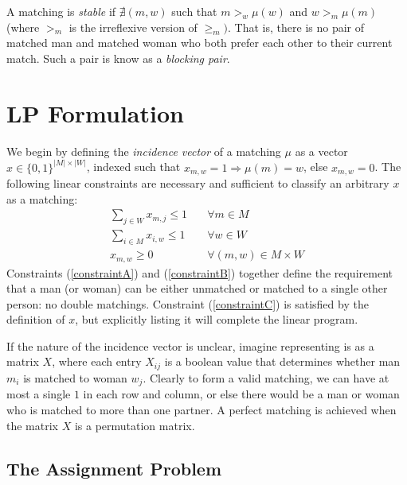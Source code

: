\documentclass[twoside]{article}
\begin{document}
A matching is \textit{stable} if $\nexists(m,w)$ such that $m >_w \mu(w)$ and $w >_m \mu(m)$ (where $>_m$ is the irreflexive version of $\geq_m)$. That is, there is no pair of matched man and matched woman who both prefer each other to their current match. Such a pair is know as a \textit{blocking pair}.

\section{LP Formulation}
We begin by defining the \textit{incidence vector} of a matching $\mu$ as a vector $x \in \lbrace 0, 1 \rbrace ^{|M|\times |W|}$, indexed such that $x_{m,w}=1 \Rightarrow \mu(m) = w$, else $x_{m,w}=0$. The following linear constraints are necessary and sufficient to classify an arbitrary $x$ as a matching:
\begin{align}
    \sum_{j\in W} x_{m,j} \leq 1 & \quad \forall m \in M \tag{A} \label{constraintA}\\
    \sum_{i\in M} x_{i,w} \leq 1 & \quad \forall w \in W \tag{B} \label{constraintB}\\
    x_{m,w} \geq 0 & \quad \forall (m,w) \in M \times W \tag{C} \label{constraintC}
\end{align}
Constraints (\ref{constraintA}) and (\ref{constraintB}) together define the requirement that a man (or woman) can be either unmatched or matched to a single other person: no double matchings. Constraint (\ref{constraintC}) is satisfied by the definition of $x$, but explicitly listing it will complete the linear program. 

If the nature of the incidence vector is unclear, imagine representing is as a matrix $X$, where each entry $X_{ij}$ is a boolean value that determines whether man $m_i$ is matched to woman $w_j$. Clearly to form a valid matching, we can have at most a single $1$ in each row and column, or else there would be a man or woman who is matched to more than one partner. A perfect matching is achieved when the matrix $X$ is a permutation matrix. 
\subsection{The Assignment Problem}
\end{document}
